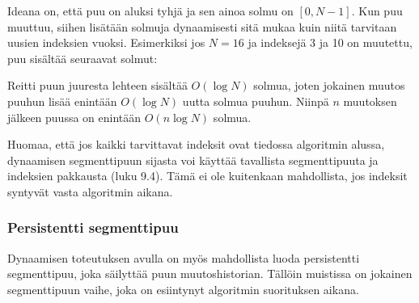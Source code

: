 Ideana on, että puu on aluksi tyhjä
ja sen ainoa solmu on $[0,N-1]$.
Kun puu muuttuu, siihen lisätään
solmuja dynaamisesti sitä mukaa kuin niitä tarvitaan
uusien indeksien vuoksi.
Esimerkiksi jos $N=16$ ja indeksejä
3 ja 10 on muutettu,
puu sisältää seuraavat solmut:
\begin{center}
\end{center}

Reitti puun juuresta lehteen sisältää
$O(\log N)$ solmua,
joten jokainen muutos puuhun lisää
enintään $O(\log N)$ uutta solmua puuhun.
Niinpä $n$ muutoksen jälkeen puussa
on enintään $O(n \log N)$ solmua.

Huomaa, että jos kaikki tarvittavat indeksit
ovat tiedossa
algoritmin alussa, dynaamisen segmenttipuun
sijasta voi käyttää tavallista segmenttipuuta
ja indeksien pakkausta (luku 9.4).
Tämä ei ole kuitenkaan mahdollista,
jos indeksit syntyvät vasta algoritmin aikana.

\subsubsection{Persistentti segmenttipuu}


Dynaamisen toteutuksen avulla on myös
mahdollista luoda persistentti segmenttipuu,
joka säilyttää puun muutoshistorian.
Tällöin muistissa on jokainen
segmenttipuun vaihe, joka on esiintynyt
algoritmin suorituksen aikana.

